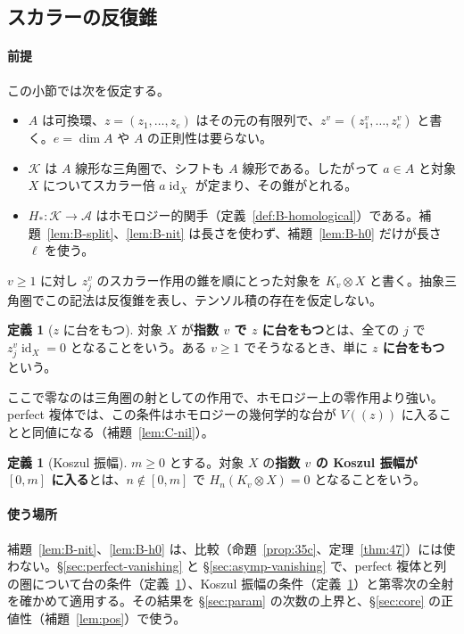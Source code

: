 \documentclass[11pt,a4paper]{ltjsarticle}
\numberwithin{equation}{section}
\theoremstyle{plain}
\theoremstyle{definition}
\newtheorem{definition}[theorem]{定義}
\theoremstyle{definition}
\begin{document}
\subsection{スカラーの反復錐}\label{sec:abstract-cone}

\paragraph{前提}
この小節では次を仮定する。
\begin{itemize}
  \item $A$ は可換環、$z=(z_1,\dots,z_e)$ はその元の有限列で、$z^v=(z_1^v,\dots,z_e^v)$ と書く。$e=\dim A$ や $A$ の正則性は要らない。
  \item $\mathcal{K}$ は $A$ 線形な三角圏で、シフトも $A$ 線形である。したがって $a\in A$ と対象 $X$ についてスカラー倍 $a\operatorname{id}_X$ が定まり、その錐がとれる。
  \item $H_*\colon\mathcal{K}\to\mathcal{A}$ はホモロジー的関手（定義~\ref{def:B-homological}）である。補題~\ref{lem:B-split}、\ref{lem:B-nit} は長さを使わず、補題~\ref{lem:B-h0} だけが長さ $\ell$ を使う。
\end{itemize}
$v\ge1$ に対し $z_j^v$ のスカラー作用の錐を順にとった対象を $K_v\otimes X$ と書く。抽象三角圏でこの記法は反復錐を表し、テンソル積の存在を仮定しない。

\begin{definition}[$z$ に台をもつ]\label{def:B-supp}
対象 $X$ が\textbf{指数 $v$ で $z$ に台をもつ}とは、全ての $j$ で $z_j^v\operatorname{id}_X=0$ となることをいう。ある $v\ge1$ でそうなるとき、単に \textbf{$z$ に台をもつ}という。
\end{definition}
ここで零なのは三角圏の射としての作用で、ホモロジー上の零作用より強い。perfect 複体では、この条件はホモロジーの幾何学的な台が $V((z))$ に入ることと同値になる（補題~\ref{lem:C-nil}）。

\begin{definition}[Koszul 振幅]\label{def:B-kos}
$m\ge0$ とする。対象 $X$ の\textbf{指数 $v$ の Koszul 振幅が $[0,m]$ に入る}とは、$n\notin[0,m]$ で $H_n(K_v\otimes X)=0$ となることをいう。
\end{definition}

\paragraph{使う場所}
補題~\ref{lem:B-nit}、\ref{lem:B-h0} は、比較（命題~\ref{prop:35c}、定理~\ref{thm:47}）には使わない。§\ref{sec:perfect-vanishing} と §\ref{sec:asymp-vanishing} で、perfect 複体と列の圏について台の条件（定義~\ref{def:B-supp}）、Koszul 振幅の条件（定義~\ref{def:B-kos}）と第零次の全射を確かめて適用する。その結果を §\ref{sec:param} の次数の上界と、§\ref{sec:core} の正値性（補題~\ref{lem:pos}）で使う。
\end{document}
